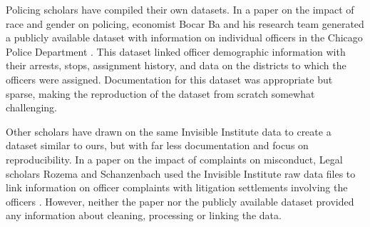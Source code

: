 Policing scholars have compiled their own datasets. In a paper on the impact of
race and gender on policing, economist Bocar Ba and his research team generated
a publicly available dataset with information on individual officers in the
Chicago Police Department \cite{ba2021role}. This dataset linked officer
demographic information with their arrests, stops, assignment history, and data
on the districts to which the officers were assigned. Documentation for this
dataset was appropriate but sparse, making the reproduction of the dataset from
scratch somewhat challenging.

Other scholars have drawn on the same Invisible Institute data to create
a dataset similar to ours, but with far less documentation and focus on
reproducibility. In a paper on the impact of complaints on misconduct, Legal
scholars Rozema and Schanzenbach used the Invisible Institute raw data files to
link information on officer complaints with litigation settlements involving
the officers \cite{Rozema19}. However, neither the paper nor the publicly
available dataset provided any information about cleaning, processing or
linking the data. 
